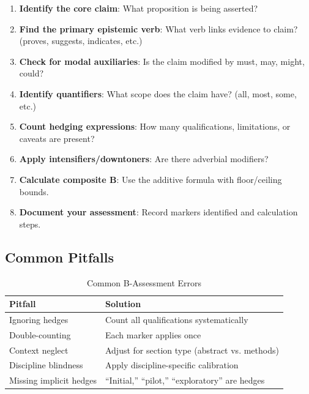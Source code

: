 \documentclass[11pt,a4paper]{article}
\theoremstyle{remark}
\begin{document}
\begin{enumerate}
    \item \textbf{Identify the core claim}: What proposition is being asserted?

    \item \textbf{Find the primary epistemic verb}: What verb links evidence to claim? (proves, suggests, indicates, etc.)

    \item \textbf{Check for modal auxiliaries}: Is the claim modified by must, may, might, could?

    \item \textbf{Identify quantifiers}: What scope does the claim have? (all, most, some, etc.)

    \item \textbf{Count hedging expressions}: How many qualifications, limitations, or caveats are present?

    \item \textbf{Apply intensifiers/downtoners}: Are there adverbial modifiers?

    \item \textbf{Calculate composite B}: Use the additive formula with floor/ceiling bounds.

    \item \textbf{Document your assessment}: Record markers identified and calculation steps.
\end{enumerate}

\subsection{Common Pitfalls}

\begin{table}[h]
\centering
\caption{Common B-Assessment Errors}
\label{tab:pitfalls}
\begin{tabular}{lp{8cm}}
\toprule
\textbf{Pitfall} & \textbf{Solution} \\
\midrule
Ignoring hedges & Count all qualifications systematically \\
Double-counting & Each marker applies once \\
Context neglect & Adjust for section type (abstract vs. methods) \\
Discipline blindness & Apply discipline-specific calibration \\
Missing implicit hedges & ``Initial,'' ``pilot,'' ``exploratory'' are hedges \\
\bottomrule
\end{tabular}
\end{table}
\end{document}
